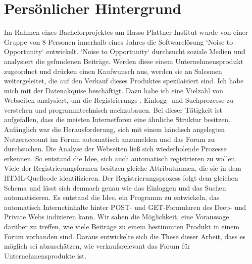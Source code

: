 \section{Persönlicher Hintergrund}
Im Rahmen eines Bachelorprojektes am Hasso-Plattner-Institut wurde von einer Gruppe von 8 Personen  innerhalb eines Jahres die Softwarelösung `Noise to Opportunity` entwickelt. `Noise to Opportunity` durchsucht soziale Medien und analysiert die gefundenen Beiträge. Werden diese einem Unternehmensprodukt zugeordnet und drücken einen Kaufwunsch aus, werden sie an Salesmen weitergeleitet, die auf den Verkauf dieses Produktes spezilaisiert sind. Ich habe mich mit der Datenakquise beschäftigt. Dazu habe ich eine Vielzahl von Webseiten analysiert, um die Registrierungs-, Einlogg- und Suchprozesse zu verstehen und programmtechnisch nachzubauen. Bei dieser Tätigkeit ist aufgefallen, dass die meisten Internetforen eine ähnliche Struktur besitzen. Anfänglich war die Herausforderung, sich mit einem händisch angelegten Nutzeraccount im Forum automatisch anzumelden und das Forum zu durchsuchen. Die Analyse der Webseiten ließ sich wiederholende Prozesse erkennen. So entstand die Idee, sich auch automatisch registrieren zu wollen.
Viele der Registrierungsformen besitzen gleiche Attributnamen, die sie in dem HTML-Quellcode identifizieren. Der Registrierungsprozess folgt dem gleichen Schema und lässt sich demnach genau wie das Einloggen und das Suchen automatisieren. Es entstand die Idee, ein Programm zu entwickeln, das automatisch Internetinhalte hinter POST- und GET-Formularen des Deep- und Private Webs indizieren kann. Wir sahen die Möglichkeit, eine Voraussage darüber zu treffen, wie viele Beiträge zu einem bestimmten Produkt in einem Forum vorhanden sind.
Daraus entwickelte sich die These dieser Arbeit, dass es möglich sei abzuschätzen, wie verkaufsrelevant das Forum für Unternehmensprodukte ist.
\newpage